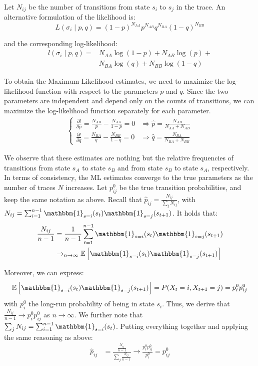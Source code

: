 \documentclass[twocolumn, 9pt]{extarticle}
\begin{document}
Let $N_{ij}$ be the number of transitions from state $s_i$ to $s_j$ in the trace. An alternative formulation of the likelihood is:
\[
L(\sigma_i \mid p, q) = (1 - p)^{N_{AA}} p^{N_{AB}} q^{N_{BA}} (1 - q)^{N_{BB}}
\]

and the corresponding log-likelihood:
\begin{align*}
    l(\sigma_i \mid p, q) =& N_{AA} \log(1 - p) + N_{AB} \log(p) +\\
    &N_{BA} \log(q) + N_{BB} \log(1 - q)
\end{align*}

To obtain the Maximum Likelihood estimates, we need to maximize the log-likelihood function with respect to the parameters $p$ and $q$.
Since the two parameters are independent and depend only on the counts of transitions, we can maximize the log-likelihood function separately for each parameter.
\begin{align*}
    \begin{cases}
        \frac{\partial l}{\partial p} = \frac{N_{AB}}{p} - \frac{N_{AA}}{1 - p} = 0 &\Rightarrow \hat p = \frac{N_{AB}}{N_{AA} + N_{AB}} \\
        \frac{\partial l}{\partial q} = \frac{N_{BA}}{q} - \frac{N_{BB}}{1 - q} = 0 &\Rightarrow \hat q = \frac{N_{BA}}{N_{BA} + N_{BB}}
    \end{cases}
\end{align*}

We observe that these estimates are nothing but the relative frequencies of transitions from state $s_A$ to state $s_B$ and from state $s_B$ to state $s_A$, respectively.
\\

In terms of consistency, the ML estimates converge to the true parameters as the number of traces $N$ increases.
Let $p_{ij}^0$ be the true transition probabilities, and keep the same notation as above. Recall that
$\hat p_{ij} = \frac{N_{ij}}{\sum_j N_{ij}}$, with $N_{ij} = \sum_{i=1}^{n-1} \mathbbm{1}_{s=i}(s_t) \mathbbm{1}_{s=j}(s_{t+1})$.
It holds that:
\begin{align*}
    \frac{N_{ij}}{n-1} &= \frac{1}{n-1} \sum_{t=1}^{n-1} \mathbbm{1}_{s=i}(s_t) \mathbbm{1}_{s=j}(s_{t+1}) \\
    &\to_{n \to \infty} \mathbb{E} \left[ \mathbbm{1}_{s=i}(s_t) \mathbbm{1}_{s=j}(s_{t+1}) \right] \\
\end{align*}

Moreover, we can express:
$$\mathbb{E} \left[ \mathbbm{1}_{s=i}(s_t) \mathbbm{1}_{s=j}(s_{t+1}) \right] = P(X_t = i, X_{t+1} = j) = p_i^0 p_{ij}^0$$
with $p_i^0$ the long-run probability of being in state $s_i$. Thus, we derive that $\frac{N_{ij}}{n-1} \to p_i^0 p_{ij}^0$ as $n \to \infty$.
We further note that $\sum_j N_{ij} = \sum_{i=1}^{n-1} \mathbbm{1}_{s=i}(s_t)$. Putting everything together and applying the same reasoning as above:
\begin{align*}
    \hat p_{ij} &= \frac{\frac{N_{ij}}{n-1}}{\sum_j \frac{N_{ij}}{n-1}} \to \frac{p_i^0 p_{ij}^0}{p_i^0} = p_{ij}^0
\end{align*}
\end{document}
